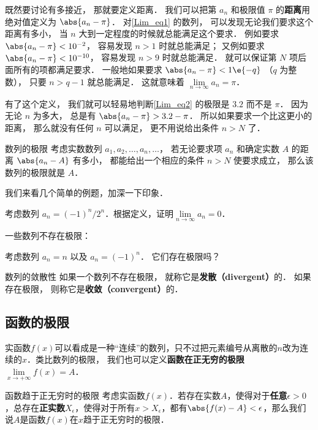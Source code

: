 既然要讨论有多接近， 那就要定义距离． 我们可以把第 $a_n$ 和极限值 $\pi$ 的\textbf{距离}用绝对值定义为 $\abs{a_n - \pi}$． 对\autoref{Lim_eq1} 的数列， 可以发现无论我们要求这个距离有多小， 当 $n$ 大到一定程度的时候就总能满足这个要求． 例如要求 $\abs{a_n - \pi} < 10^{-2}$， 容易发现 $n > 1$ 时就总能满足； 又例如要求 $\abs{a_n - \pi} < 10^{-10}$， 容易发现 $n > 9$ 时就总能满足． 就可以保证第 $N$ 项后面所有的项都满足要求． 一般地如果要求 $\abs{a_n - \pi} < 1\e{-q}$ （$q$ 为整数）， 只要 $n > q-1$ 就总能满足． 这就意味着 $\lim\limits_{n \to \infty } a_n = \pi$．

有了这个定义， 我们就可以轻易地判断\autoref{Lim_eq2} 的极限是 $3.2$ 而不是 $\pi$． 因为无论 $n$ 为多大， 总是有 $\abs{a_n - \pi} > 3.2 - \pi$． 所以如果要求一个比这更小的距离， 那么就没有任何 $n$ 可以满足， 更不用说给出条件 $n > N$ 了．

\begin{definition}{数列的极限}\label{Lim_def2}
考虑实数数列 $a_1, a_2, \dots, a_n, \dots$， 若无论要求项 $a_n$ 和确定实数 $A$ 的距离 $\abs{a_n - A}$ 有多小， 都能给出一个相应的条件 $n > N$ 使要求成立， 那么该数列的极限就是 $A$．
\end{definition}


我们来看几个简单的例题，加深一下印象．

\begin{exercise}{}
考虑数列 $a_n= {(-1)^n}/{2^n}$．根据定义，证明$\lim\limits_{n\to\infty}a_n=0$．
\end{exercise}

一些数列不存在极限：
\begin{exercise}{}\label{Lim_exe1}
考虑数列 $a_n = n$ 以及 $a_n=(-1)^n$． 它们存在极限吗？
\end{exercise}


\begin{definition}{数列的敛散性}\label{Lim_def4}
如果一个数列不存在极限， 就称它是\textbf{发散（divergent）}的． 如果存在极限， 则称它是\textbf{收敛（convergent）}的．
\end{definition}

\subsection{函数的极限}
实函数$f(x)$可以看成是一种“连续”的数列，只不过把元素编号从离散的$n$改为连续的$x$．类比数列的极限， 我们也可以定义\textbf{函数在正无穷的极限} $\lim\limits_{x\to +\infty} f(x) = A$．

\begin{definition}{函数趋于正无穷时的极限}\label{Lim_def1}
考虑实函数$f(x)$．若存在实数$A$，使得对于\textbf{任意}$\epsilon>0$，总存在\textbf{正实数}$X_\epsilon$，使得对于所有$x>X_\epsilon$，都有$\abs{f(x)-A}<\epsilon$，那么我们说$A$是函数$f(x)$在$x$趋于正无穷时的极限．
\end{definition}


